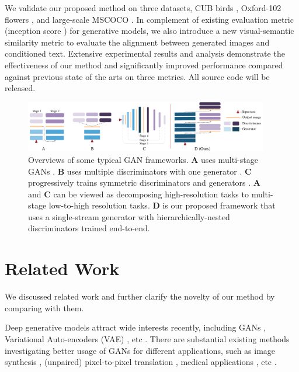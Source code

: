\documentclass[10pt,twocolumn,letterpaper]{article}
\begin{document}
We validate our proposed method on three datasets, CUB birds \cite{welinder2010caltech}, Oxford-102 flowers \cite{Nilsback08}, and large-scale MSCOCO \cite{lin2014microsoft}. In complement of existing evaluation metric (inception score \cite{improvedGAN}) for generative models, we also introduce a new visual-semantic similarity metric to evaluate the alignment between generated images and conditioned text. Extensive experimental results and analysis demonstrate the effectiveness of our method and significantly improved performance compared against previous state of the arts on three metrics. All source code will be released.


\begin{figure}[t]
	\centering
	\includegraphics[width=0.95\textwidth]{figure/views2.pdf}
	\vspace{-.2cm}
	\caption{Overviews of some typical GAN frameworks. \textbf{A} uses multi-stage GANs \cite{han2017stackgan,denton2015deep}. \textbf{B} uses multiple discriminators with one generator \cite{durugkar2016generative,tu_etal_nips17_d2gan}. \textbf{C} progressively trains symmetric discriminators and generators \cite{Karras2017progressive,huang2016stacked}. \textbf{A} and \textbf{C} can be viewed as decomposing high-resolution tasks to multi-stage low-to-high resolution tasks.  \textbf{D} is our proposed framework that uses a single-stream generator with hierarchically-nested discriminators trained end-to-end.} \label{fig:archs-review}
\end{figure}


\section{Related Work}
We discussed related work and further clarify the novelty of our method by comparing with them.

Deep generative models attract wide interests recently, including GANs \cite{goodfellow2014generative}, Variational Auto-encoders (VAE) \cite{kingma2013auto}, etc \cite{oord2016pixel}. 
There are substantial existing methods investigating better usage of GANs for different applications, such as image synthesis \cite{radford2015unsupervised, shrivastava2016learning}, (unpaired) pixel-to-pixel translation \cite{isola2016image,zhu2017unpaired}, medical applications \cite{costa2017towards}, etc \cite{ledig2016photo,huang2016stacked}.
\end{document}
